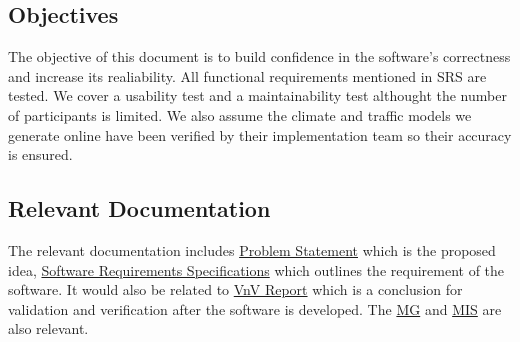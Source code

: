 \documentclass[12pt, titlepage]{article}
\begin{document}
\subsection{Objectives}
The objective of this document is to build confidence in the software's correctness and increase its realiability. All functional requirements mentioned in SRS are tested. We cover a usability test and a maintainability test althought the number of participants is limited. We also assume the climate and traffic models we generate online have been verified by their implementation team so their accuracy is ensured. 





\subsection{Relevant Documentation}
The relevant documentation includes \href{https://github.com/CynthiaLiu0805/BridgeCorrosion/blob/main/docs/ProblemStatementAndGoals/ProblemStatement.pdf}{Problem Statement} which is the proposed idea, \href{https://github.com/CynthiaLiu0805/BridgeCorrosion/blob/main/docs/SRS/SRS.pdf}{Software Requirements Specifications} which outlines the requirement of the software. It would also be related to \href{https://github.com/CynthiaLiu0805/BridgeCorrosion/blob/main/docs/VnVReport/VnVReport.pdf}{VnV Report} which is a conclusion for validation and verification after the software is developed. The \href{https://github.com/CynthiaLiu0805/BridgeCorrosion/blob/main/docs/Design/SoftArchitecture/MG.pdf}{MG} and \href{https://github.com/CynthiaLiu0805/BridgeCorrosion/blob/main/docs/Design/SoftDetailedDes/MIS.pdf}{MIS} are also relevant.
\end{document}
